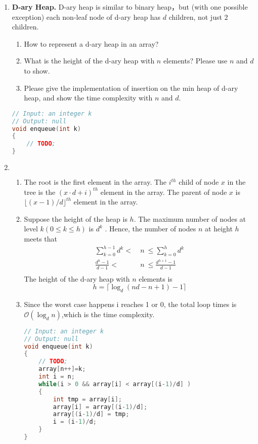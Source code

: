 \documentclass[12pt,a4paper]{article}
\makeatletter
\newtheorem*{solution}{Solution}
\theoremstyle{definition}
\renewenvironment{solution}[1][Solution] {\par\pushQED{\qed}\normalfont\topsep6\p@\@plus6\p@\relax\trivlist\item[\hskip\labelsep\bfseries#1\@addpunct{.}]\ignorespaces}{\popQED\endtrivlist\@endpefalse} \makeatother
\makeatother
\begin{document}
\begin{enumerate}

\item \textbf{D-ary Heap.} D-ary heap is similar to binary heap，but (with one possible exception) each non-leaf node of d-ary heap has $d$ children, not just $2$ children.

\begin{enumerate}
\item How to represent a d-ary heap in an array?
\item What is the height of the d-ary heap with $n$ elements? Please use $n$ and $d$ to show.
\item Please give the implementation of insertion on the min heap of d-ary heap, and show the time complexity with $n$ and $d$.
\end{enumerate}

\begin{lstlisting}[language=C++]
// Input: an integer k
// Output: null
void enqueue(int k)
{
	// TODO;
}
\end{lstlisting}

\begin{solution}
    $\ $ 
	\begin{enumerate}
	    \item The root is the first element in the array. The $i^{th}$ child of node $x$ in the tree is the $(x\cdot d+i)^{th}$ element in the array. The parent of node $x$ is $\lfloor (x-1)/d \rfloor^{th} $ element in the array.
	    \item Suppose the height of the heap is $h$. The maximum number of nodes at level $k(0\leq k\leq h)$ is $d^k$ . Hence, the number of nodes $n$ at height $h$ meets that
\begin{equation*}
	\begin{split}
	\sum_{k=0}^{h-1}d^k <\  &n\ \leq \sum_{k=0}^{h}d^k\\
	\frac{d^h-1}{d-1} < \ &n\ \leq\frac{d^{h+1}-1}{d-1}\\
	\end{split}
\end{equation*}
The height of the d-ary heap with $n$ elements is
$$
	h=\lceil\log_d(nd-n+1)-1\rceil
$$
	    \item Since the worst case happens i reaches 1 or 0, the total loop times is $\mathcal{O}(\log_dn)$,which is the time complexity.
\begin{lstlisting}[language=C++]
// Input: an integer k
// Output: null
void enqueue(int k)
{
	// TODO;
	array[n++]=k;
	int i = n;
	while(i > 0 && array[i] < array[(i-1)/d] )
	{
        int tmp = array[i];
        array[i] = array[(i-1)/d];
        array[(i-1)/d] = tmp;
        i = (i-1)/d;
	}
}
\end{lstlisting}
	\end{enumerate}
\end{solution}


\end{enumerate}
\end{document}
